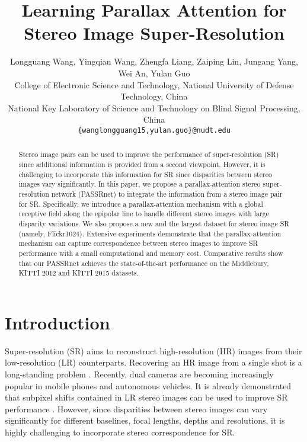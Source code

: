 \documentclass[10pt,twocolumn,letterpaper]{article}
\begin{document}
\title{Learning Parallax Attention for Stereo Image Super-Resolution}

\author{Longguang Wang, Yingqian Wang, Zhengfa Liang, Zaiping Lin, Jungang Yang, Wei An, Yulan Guo\\
	College of Electronic Science and Technology, National University of Defense Technology, China\\
	National Key Laboratory of Science and Technology on Blind Signal Processing, China\\
	{\tt\small \{wanglongguang15,yulan.guo\}@nudt.edu}}




\maketitle


\begin{abstract}
	Stereo image pairs can be used to improve the performance of super-resolution (SR) since additional information is provided from a second viewpoint. However, it is challenging to incorporate this information for SR since disparities between stereo images vary significantly. In this paper, we propose a parallax-attention stereo super-resolution network (PASSRnet) to integrate the information from a stereo image pair for SR. Specifically, we introduce a parallax-attention mechanism with a global receptive field along the epipolar line to handle different stereo images with large disparity variations. We also propose a new and the largest dataset for stereo image SR (namely, Flickr1024). Extensive experiments demonstrate that the parallax-attention mechanism can capture correspondence between stereo images to improve SR performance with a small computational and memory cost. Comparative results show that our PASSRnet achieves the state-of-the-art performance on the Middlebury, \textcolor{black}{KITTI 2012 and KITTI 2015} datasets.
	
\end{abstract}

\section{Introduction}
Super-resolution (SR) aims to reconstruct high-resolution (HR) images from their low-resolution (LR) counterparts. Recovering an HR image from a single shot is a long-standing problem \cite{2014-LearningaDeepConvolutionalNetworkforImageSuperResolution-Dong-184-199,2016-RealTimeSingleImageandVideoSuperResolutionUsinganEfficientSubPixelConvolutionalNeuralNetwork-Shi-1874-1883,2018-FastandAccurateSingleImageSuperResolutionViaInformationDistillationNetwork-Hui--}. Recently, dual cameras are becoming increasingly popular in mobile phones and autonomous vehicles. It is already demonstrated that subpixel shifts contained in LR stereo images can be used to improve SR performance \cite{2003-SuperResolutionImageReconstruction:aTechnicalOverview-Park-21-36}. However, since disparities between stereo images can vary significantly for different baselines, focal lengths, depths and resolutions, it is highly challenging to incorporate stereo correspondence for SR. 
\end{document}

